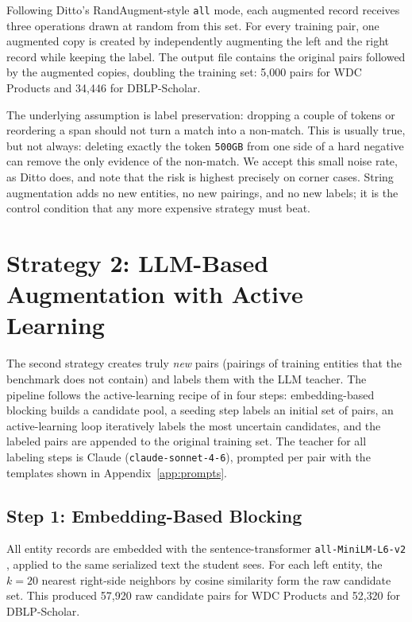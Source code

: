 \documentclass[a4paper,oneside,bibliography=totoc]{scrbook}
\begin{document}
Following Ditto's RandAugment-style \texttt{all} mode, each augmented record receives three operations drawn at random from this set. For every training pair, one augmented copy is created by independently augmenting the left and the right record while keeping the label. The output file contains the original pairs followed by the augmented copies, doubling the training set: 5{,}000 pairs for WDC Products and 34{,}446 for DBLP-Scholar.

The underlying assumption is label preservation: dropping a couple of tokens or reordering a span should not turn a match into a non-match. This is usually true, but not always: deleting exactly the token \texttt{500GB} from one side of a hard negative can remove the only evidence of the non-match. We accept this small noise rate, as Ditto does, and note that the risk is highest precisely on corner cases. String augmentation adds no new entities, no new pairings, and no new labels; it is the control condition that any more expensive strategy must beat.

\section{Strategy 2: LLM-Based Augmentation with Active Learning}
\label{sec:method_llm}

The second strategy creates truly \emph{new} pairs (pairings of training entities that the benchmark does not contain) and labels them with the LLM teacher. The pipeline follows the active-learning recipe of \citet{steiner2026labeling} in four steps: embedding-based blocking builds a candidate pool, a seeding step labels an initial set of pairs, an active-learning loop iteratively labels the most uncertain candidates, and the labeled pairs are appended to the original training set. The teacher for all labeling steps is Claude (\texttt{claude-sonnet-4-6}), prompted per pair with the templates shown in Appendix~\ref{app:prompts}.

\subsection{Step 1: Embedding-Based Blocking}
\label{sec:method_llm_blocking}

All entity records are embedded with the sentence-transformer \texttt{all-MiniLM-L6-v2} \cite{reimers2019sentence,wang2020minilm}, applied to the same serialized text the student sees. For each left entity, the $k=20$ nearest right-side neighbors by cosine similarity form the raw candidate set. This produced 57{,}920 raw candidate pairs for WDC Products and 52{,}320 for DBLP-Scholar.
\end{document}
